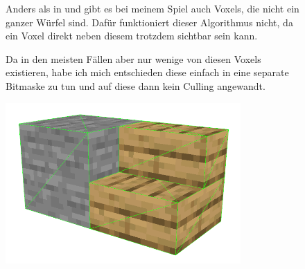 \begin{figure}[ht]
	\begin{minipage}[c]{0.63\textwidth}
Anders als in \cite{yt_bin_greedy_mesher} und
\cite{gh_bin_greedy_mesher} gibt es bei meinem
Spiel auch Voxels, die nicht ein ganzer Würfel
sind. Dafür funktioniert dieser Algorithmus nicht,
da ein Voxel direkt neben diesem trotzdem sichtbar
sein kann.

Da in den meisten Fällen aber nur wenige von diesen
 Voxels existieren, habe ich mich
entschieden diese einfach in eine separate Bitmaske
zu tun und auf diese dann kein Culling angewandt.
	\end{minipage}
	\begin{minipage}[c]{0.35\textwidth}
		\begin{center}
\includegraphics[width=0.8\textwidth]{../assets/culling/stair_next_to_stone.png}
		\end{center}
	\end{minipage}\hfill
\end{figure}
